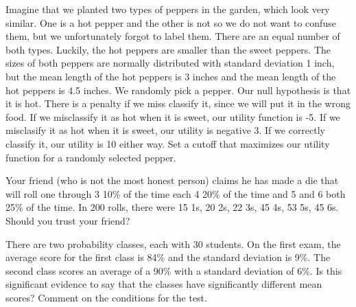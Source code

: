 \begin{exe} Imagine that we planted two types of peppers in the garden, which look very similar.  One is a hot pepper and the other is not so we do not want to confuse them, but we unfortunately forgot to label them.  There are an equal number of both types.  Luckily, the hot peppers are smaller than the sweet peppers.  The sizes of both peppers are normally distributed with standard deviation 1 inch, but the mean length of the hot peppers is 3 inches and the mean length of the hot peppers is 4.5 inches.  We randomly pick a pepper. Our null hypothesis is that it is hot.  There  is a penalty if we miss classify it, since we will put it in the wrong food.  If we misclassify it as hot when it is sweet, our utility function is -5.  If we misclasify it as hot when it is sweet, our utility is negative 3.  If we correctly classify it, our utility is 10 either way.  Set a cutoff that maximizes our utility function for a randomly selected pepper. \end{exe}

\begin{exe} Your friend (who is not the most honest person) claims he has made a die that will roll one through 3 10\% of the time each 4 20\% of the time and 5 and 6 both 25\% of the time.  In 200 rolls, there were 15 1s, 20 2s, 22 3s, 45 4s, 53 5s, 45 6s. Should you trust your friend? \end{exe}

\begin{exe} There are two probability classes, each with 30 students.  On the first exam, the average score for the first class is 84\% and the standard deviation is 9\%.  The second class scores an average of a 90\% with a standard deviation of 6\%.  Is this significant evidence to say that the classes have significantly different mean scores?  Comment on the conditions for the test. \end{exe}

